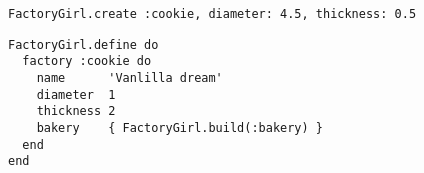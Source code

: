 \begin{lstlisting}[caption=Example usage of the factory defined in code listing \ref{lst:factory_def}.,
                   label=lst:factory_use, float=t]
FactoryGirl.create :cookie, diameter: 4.5, thickness: 0.5
\end{lstlisting}

\begin{lstlisting}[caption=A factory definition for a Cookie model.,
                   label=lst:factory_def, float=t]
FactoryGirl.define do
  factory :cookie do
    name      'Vanlilla dream'
    diameter  1
    thickness 2
    bakery    { FactoryGirl.build(:bakery) }
  end
end
\end{lstlisting}

